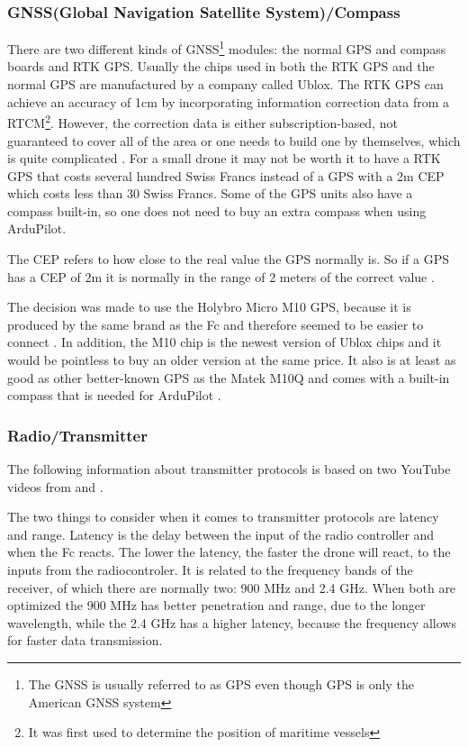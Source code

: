 \documentclass[svgnames]{article}
\begin{document}
	\subsubsection{GNSS(Global Navigation Satellite System)/Compass}
	There are two different kinds of \gls{GNSS}\footnote{The \gls{GNSS} is usually referred to as \gls{GPS} even though \gls{GPS} is only the American \gls{GNSS} system} modules: the normal \gls{GPS} and compass boards and \gls{RTK} \gls{GPS}. Usually the chips used in both the RTK GPS and the normal GPS are manufactured by a company called Ublox. The RTK GPS can achieve an accuracy of 1cm by incorporating information correction data from a \gls{RTCM}\footnote{It was first used to determine the position of maritime vessels}. However, the correction data is either subscription-based, not guaranteed to cover all of the area or one needs to build one by themselves, which is quite complicated \cite{rtkgps}. For a small drone it may not be worth it to have a \gls{RTK} \gls{GPS} that costs several hundred Swiss Francs instead of a \gls{GPS} with a 2m \gls{CEP} which costs less than 30 Swiss Francs. Some of the \gls{GPS} units also have a compass built-in, so one does not need to buy an extra compass when using ArduPilot. 
	\begin{Explanation}
		\item The \gls{CEP} refers to how close to the real value the \gls{GPS} normally is. So if a \gls{GPS} has a \gls{CEP}
		of 2m it is normally in the range of 2 meters of the correct value \cite{CEP}.
	\end{Explanation}
	
	The decision was made to use the Holybro Micro M10 \gls{GPS}, because it is produced by the same brand as the Fc and therefore seemed to be easier to connect \cite{holybrom10micro}. In addition, the M10 chip is the newest version of Ublox chips and it would be pointless to buy an older version at the same price. It also is at least as good as other better-known GPS as the Matek M10Q and comes with a built-in compass that is needed for ArduPilot \cite{gpstest}.

	\subsubsection{Radio/Transmitter}
	The following information about transmitter protocols is based on two YouTube videos from \textcite{transprotocols} and \textcite{mlrs}.
	
	The two things to consider when it comes to transmitter protocols are latency and range. Latency is the delay between the input of the radio controller and when the \gls{Fc} reacts. The lower the latency, the faster the drone will react, to the inputs from the radiocontroler. It is related to the frequency bands of the receiver, of which there are normally two: 900 MHz and 2.4 GHz. When both are optimized the 900 MHz has better penetration and range, due to the longer wavelength, while the 2.4 GHz has a higher latency, because the frequency allows for faster data transmission.
	\newpage
\end{document}
